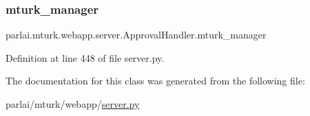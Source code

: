 \subsubsection{\texorpdfstring{mturk\+\_\+manager}{mturk\_manager}}
{\footnotesize\ttfamily parlai.\+mturk.\+webapp.\+server.\+Approval\+Handler.\+mturk\+\_\+manager}



Definition at line 448 of file server.\+py.



The documentation for this class was generated from the following file\+:\begin{DoxyCompactItemize}
\item 
parlai/mturk/webapp/\hyperlink{server_8py}{server.\+py}\end{DoxyCompactItemize}
